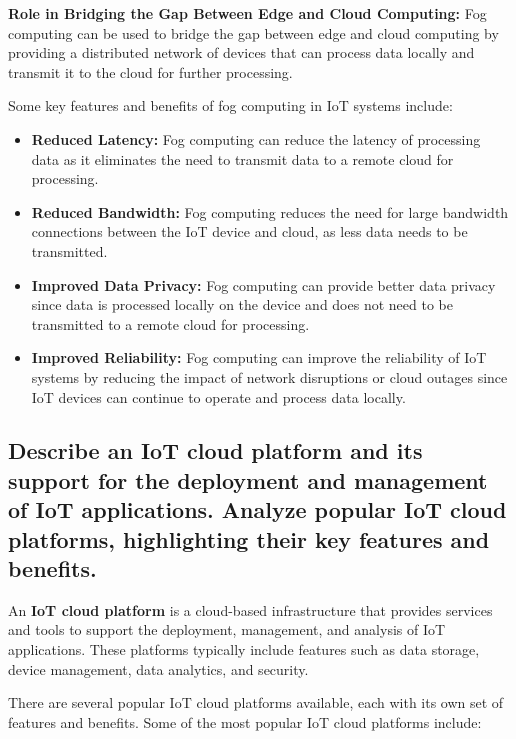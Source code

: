 \documentclass[12pt, a4paper, oneside]{article}
\begin{document}
\textbf{Role in Bridging the Gap Between Edge and Cloud Computing:} Fog computing can be used to bridge the gap between edge and cloud computing by providing a distributed network of devices that can process data locally and transmit it to the cloud for further processing.

Some key features and benefits of fog computing in IoT systems include:

\begin{itemize}
	\item \textbf{Reduced Latency:} Fog computing can reduce the latency of processing data as it eliminates the need to transmit data to a remote cloud for processing.
	\item \textbf{Reduced Bandwidth:} Fog computing reduces the need for large bandwidth connections between the IoT device and cloud, as less data needs to be transmitted.
	\item \textbf{Improved Data Privacy:} Fog computing can provide better data privacy since data is processed locally on the device and does not need to be transmitted to a remote cloud for processing.
	\item \textbf{Improved Reliability:} Fog computing can improve the reliability of IoT systems by reducing the impact of network disruptions or cloud outages since IoT devices can continue to operate and process data locally.
\end{itemize}

\subsection{Describe an IoT cloud platform and its support for the deployment and management of IoT applications. Analyze popular IoT cloud platforms, highlighting their key features and benefits.}

An \textbf{IoT cloud platform} is a cloud-based infrastructure that provides services and tools to support the deployment, management, and analysis of IoT applications. These platforms typically include features such as data storage, device management, data analytics, and security.

There are several popular IoT cloud platforms available, each with its own set of features and benefits. Some of the most popular IoT cloud platforms include:
\end{document}
